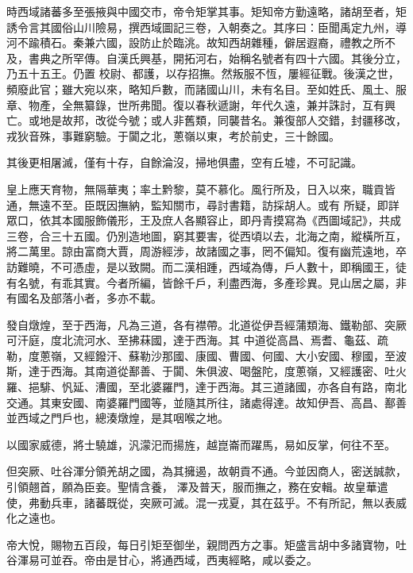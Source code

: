 \begin{pinyinscope}
 時西域諸蕃多至張掖與中國交市，帝令矩掌其事。矩知帝方勤遠略，諸胡至者，矩誘令言其國俗山川險易，撰西域圖記三卷，入朝奏之。其序曰：臣聞禹定九州，導河不踰積石。秦兼六國，設防止於臨洮。故知西胡雜種，僻居遐裔，禮教之所不及，書典之所罕傳。自漢氏興基，開拓河右，始稱名號者有四十六國。其後分立，乃五十五王。仍置
 校尉、都護，以存招撫。然叛服不恆，屢經征戰。後漢之世，頻廢此官；雖大宛以來，略知戶數，而諸國山川，未有名目。至如姓氏、風土、服章、物產，全無纂錄，世所弗聞。復以春秋遞謝，年代久遠，兼并誅討，互有興亡。或地是故邦，改從今號；或人非舊類，同襲昔名。兼復部人交錯，封疆移改，戎狄音殊，事難窮驗。于闐之北，蔥嶺以東，考於前史，三十餘國。



 其後更相屠滅，僅有十存，自餘淪沒，掃地俱盡，空有丘墟，不可記識。



 皇上應天育物，無隔華夷；率土黔黎，莫不慕化。風行所及，日入以來，職貢皆通，無遠不至。臣既因撫納，監知關市，尋討書籍，訪採胡人。或有
 所疑，即詳眾口，依其本國服飾儀形，王及庶人各顯容止，即丹青摸寫為《西圖域記》，共成三卷，合三十五國。仍別造地圖，窮其要害，從西頃以去，北海之南，縱橫所互，將二萬里。諒由富商大賈，周游經涉，故諸國之事，罔不偏知。復有幽荒遠地，卒訪難曉，不可憑虛，是以致闕。而二漢相踵，西域為傳，戶人數十，即稱國王，徒有名號，有乖其實。今者所編，皆餘千戶，利盡西海，多產珍異。見山居之屬，非有國名及部落小者，多亦不載。



 發自燉煌，至于西海，凡為三道，各有襟帶。北道從伊吾經蒲類海、鐵勒部、突厥可汗庭，度北流河水、至拂菻國，達于西海。其
 中道從高昌、焉耆、龜茲、疏勒，度蔥嶺，又經鏺汗、蘇勒沙那國、康國、曹國、何國、大小安國、穆國，至波斯，達于西海。其南道從鄯善、于闐、朱俱波、喝盤陀，度蔥嶺，又經護密、吐火羅、挹騑、忛延、漕國，至北婆羅門，達于西海。其三道諸國，亦各自有路，南北交通。其東安國、南婆羅門國等，並隨其所往，諸處得達。故知伊吾、高昌、鄯善並西域之門戶也，總湊燉煌，是其咽喉之地。



 以國家威德，將士驍雄，汎濛汜而揚旌，越崑崙而躍馬，易如反掌，何往不至。



 但突厥、吐谷渾分領羌胡之國，為其擁遏，故朝貢不通。今並因商人，密送誠款，引領翹首，願為臣妾。聖情含養，
 澤及普天，服而撫之，務在安輯。故皇華遣使，弗動兵車，諸蕃既從，突厥可滅。混一戎夏，其在茲乎。不有所記，無以表威化之遠也。



 帝大悅，賜物五百段，每日引矩至御坐，親問西方之事。矩盛言胡中多諸寶物，吐谷渾易可並吞。帝由是甘心，將通西域，西夷經略，咸以委之。




\end{pinyinscope}
